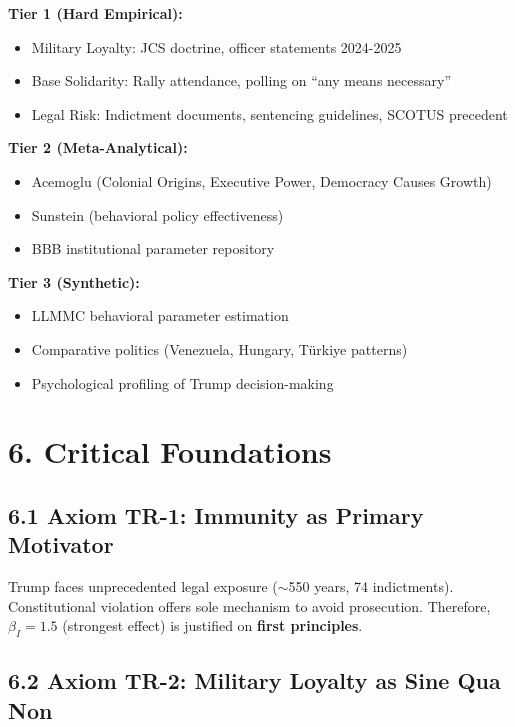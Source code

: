 \textbf{Tier 1 (Hard Empirical):}
\begin{itemize}
\item Military Loyalty: JCS doctrine, officer statements 2024-2025
\item Base Solidarity: Rally attendance, polling on ``any means necessary''
\item Legal Risk: Indictment documents, sentencing guidelines, SCOTUS precedent
\end{itemize}

\textbf{Tier 2 (Meta-Analytical):}
\begin{itemize}
\item Acemoglu (Colonial Origins, Executive Power, Democracy Causes Growth)
\item Sunstein (behavioral policy effectiveness)
\item BBB institutional parameter repository
\end{itemize}

\textbf{Tier 3 (Synthetic):}
\begin{itemize}
\item LLMMC behavioral parameter estimation
\item Comparative politics (Venezuela, Hungary, Türkiye patterns)
\item Psychological profiling of Trump decision-making
\end{itemize}

\section{6. Critical Foundations}

\subsection{6.1 Axiom TR-1: Immunity as Primary Motivator}

\begin{fancybox}
Trump faces unprecedented legal exposure ($\sim$550 years, 74 indictments). Constitutional violation offers sole mechanism to avoid prosecution. Therefore, $\beta_I = 1.5$ (strongest effect) is justified on \textbf{first principles}.
\end{fancybox}

\subsection{6.2 Axiom TR-2: Military Loyalty as Sine Qua Non}

